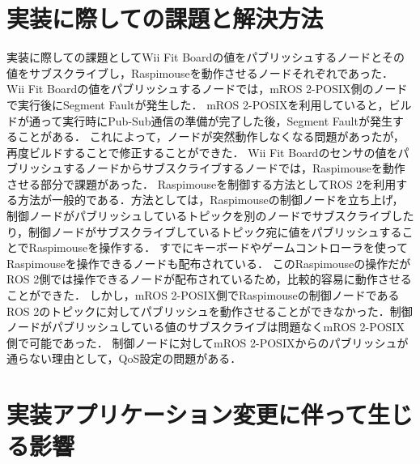 \section{実装に際しての課題と解決方法}
実装に際しての課題としてWii Fit Boardの値をパブリッシュするノードとその値をサブスクライブし，Raspimouseを動作させるノードそれぞれであった．
Wii Fit Boardの値をパブリッシュするノードでは，mROS 2-POSIX側のノードで実行後にSegment Faultが発生した．
mROS 2-POSIXを利用していると，ビルドが通って実行時にPub-Sub通信の準備が完了した後，Segment Faultが発生することがある．
これによって，ノードが突然動作しなくなる問題があったが，再度ビルドすることで修正することができた．
Wii Fit Boardのセンサの値をパブリッシュするノードからサブスクライブするノードでは，Raspimouseを動作させる部分で課題があった．
Raspimouseを制御する方法としてROS 2を利用する方法が一般的である．方法としては，Raspimouseの制御ノードを立ち上げ，制御ノードがパブリッシュしているトピックを別のノードでサブスクライブしたり，制御ノードがサブスクライブしているトピック宛に値をパブリッシュすることでRaspimouseを操作する．
すでにキーボードやゲームコントローラを使ってRaspimouseを操作できるノードも配布されている．
このRaspimouseの操作だがROS 2側では操作できるノードが配布されているため，比較的容易に動作させることができた．
しかし，mROS 2-POSIX側でRaspimouseの制御ノードであるROS 2のトピックに対してパブリッシュを動作させることができなかった．制御ノードがパブリッシュしている値のサブスクライブは問題なくmROS 2-POSIX側で可能であった．
制御ノードに対してmROS 2-POSIXからのパブリッシュが通らない理由として，QoS設定の問題がある．

\section{実装アプリケーション変更に伴って生じる影響}


